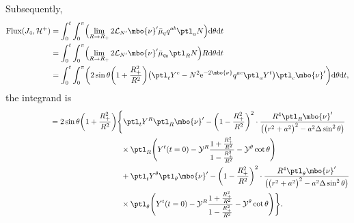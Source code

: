 Subsequently,
\begin{align*}
{\rm Flux} (J_4, \mathcal{H}^+) &{}= \int^t_0 \int^\pi _0 \Bigl(\lim_{R \to R_+} 2 \mathcal{L}_{N'} \mbo{\nu}' \bar{\mu}_q q^{ab} \ptl_a N \Bigr) {\rm d}\theta {\rm d}t \notag\\
&{}= \int^t_0 \int^\pi _0 \Bigl(\lim_{R \to R_+} 2 \mathcal{L}_{N'} \mbo{\nu}' \bar{\mu}_{q_0} \ptl_R N \Bigr) R {\rm d}\theta {\rm d}t \notag\\
&{}= \int^t_0 \int^\pi _0 \biggl(2 \sin \theta \biggl(1+ \frac{R^2_+}{R^2} \biggr) \bigl(\ptl_t Y^c - N^2 {\rm e}^{-2 \mbo{\nu}} q^{ac} \ptl_a Y^t\bigr) \ptl_c \mbo{\nu}' \biggr) {\rm d}\theta {\rm d}t,
\end{align*}
the integrand is
\begin{align*}
\hphantom{{\rm Flux} (J_4, \mathcal{H}^+)}&{}= 2 \sin \theta \biggl(1+ \frac{R^2_+}{R^2} \biggr) \Biggl\{ \ptl_t Y^R \ptl_R \mbo{\nu}' - \biggl(1- \frac{R^2_+}{R^2} \biggr)^2 \cdot \frac{R^4 \ptl_R \mbo{\nu}'}{ \bigl( \bigl(r^2+a^2\bigr)^2 -a^2 \Delta
	\sin^2 \theta \bigr)} \notag\\
& \hphantom{= 2 \sin \theta \biggl(1+ \frac{R^2_+}{R^2} \biggr) \Biggl\{}{}
\times \ptl_R \Biggl(Y^t (t=0) - \mathcal{Y}^R \frac{1 + \frac{R^2_+}{R^2}} {{1-\frac{R^2_+}{R^2}} } - \mathcal{Y}^ \theta \cot \theta \Biggr) \notag\\
&\hphantom{= 2 \sin \theta \biggl(1+ \frac{R^2_+}{R^2} \biggr) \Biggl\{}{}
+ \ptl_t Y^\theta \ptl_\theta \mbo{\nu}' - \biggl(1 - \frac{R^2_+}{R^2} \biggr)^2 \cdot \frac{R^4 \ptl_\theta \mbo{\nu}'}{ \bigl(\bigl(r^2+a^2\bigr)^2 -a^2 \Delta \sin^2 \theta\bigr)} \notag\\
& \hphantom{= 2 \sin \theta \biggl(1+ \frac{R^2_+}{R^2} \biggr) \Biggl\{}{}
\times \ptl_\theta \Biggl(Y^t(t=0) - \mathcal{Y}^R \frac{1+ \frac{R^2_+}{R^2}}{1-\frac{R^2_+}{R^2}} - \mathcal{Y}^\theta \cot \theta \Biggr) \Biggr\}.
\end{align*}

